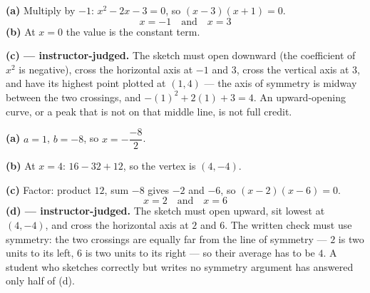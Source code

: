 \documentclass[12pt]{article}
\begin{document}

\textbf{(a)} Multiply by $-1$: $x^2 - 2x - 3 = 0$, so $(x-3)(x+1) = 0$.
\[ \boxed{x = -1 \quad \text{and} \quad x = 3} \]
\textbf{(b)} At $x = 0$ the value is the constant term. 

\textbf{(c) --- instructor-judged.} The sketch must open downward (the coefficient of $x^2$ is negative), cross the horizontal axis at $-1$ and $3$, cross the vertical axis at $3$, and have its highest point plotted at $(1, 4)$ --- the axis of symmetry is midway between the two crossings, and $-(1)^2 + 2(1) + 3 = 4$. An upward-opening curve, or a peak that is not on that middle line, is not full credit.


\textbf{(a)} $a = 1$, $b = -8$, so $x = -\dfrac{-8}{2}$. 

\textbf{(b)} At $x = 4$: $16 - 32 + 12$, so the vertex is $(4, -4)$. 

\textbf{(c)} Factor: product $12$, sum $-8$ gives $-2$ and $-6$, so $(x-2)(x-6) = 0$.
\[ \boxed{x = 2 \quad \text{and} \quad x = 6} \]
\textbf{(d) --- instructor-judged.} The sketch must open upward, sit lowest at $(4, -4)$, and cross the horizontal axis at $2$ and $6$. The written check must use symmetry: the two crossings are equally far from the line of symmetry --- $2$ is two units to its left, $6$ is two units to its right --- so their average has to be $4$. A student who sketches correctly but writes no symmetry argument has answered only half of (d).
\end{document}
